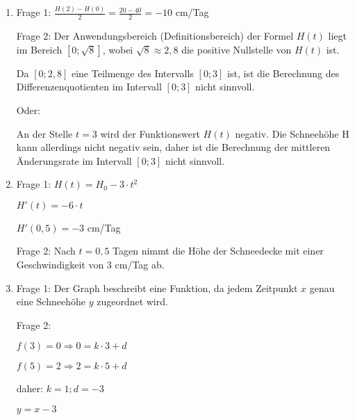 \begin{langesbeispiel}
{\begin{enumerate}
	Frage 2: Je größer $a$, desto schneller nimmt die Schneehöhe ab!
	
	\item Frage 1: $\frac{H(2)-H(0)}{2}=\frac{20-40}{2}=-10$ cm/Tag
	
	Frage 2: Der Anwendungsbereich (Definitionsbereich) der Formel $H(t)$ liegt im Bereich $[0;\sqrt{8}]$, wobei $\sqrt{8}\approx 2,8$ die positive Nullstelle von $H(t)$ ist.
	
	Da $[0;2,8]$ eine Teilmenge des Intervalls $[0;3]$ ist, ist die Berechnung des Differenzenquotienten im Intervall $[0;3]$ nicht sinnvoll.
	
	Oder:
	
	An der Stelle $t=3$ wird der Funktionswert $H(t)$ negativ. Die Schneehöhe H kann allerdings nicht negativ sein, daher ist die Berechnung der mittleren Änderungsrate im Intervall $[0;3]$ nicht sinnvoll.
	\item Frage 1: $H(t)=H_0-3\cdot t^2$
	
	$H'(t)=-6\cdot t$
	
	$H'(0,5)=-3$ cm/Tag
	
	Frage 2: Nach $t=0,5$ Tagen nimmt die Höhe der Schneedecke mit einer Geschwindigkeit von 3 cm/Tag ab.
	\item Frage 1: Der Graph beschreibt eine Funktion, da jedem Zeitpunkt $x$ genau eine Schneehöhe $y$ zugeordnet wird.
	
	Frage 2: 
	
	$f(3)=0\Rightarrow 0=k\cdot 3+d$
	
	$f(5)=2\Rightarrow 2=k\cdot 5+d$
	
	daher: $k=1; d=-3$
	
	$y=x-3$
	\end{enumerate}}
		\end{langesbeispiel}
